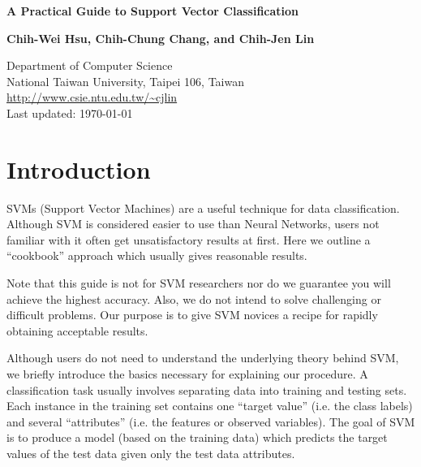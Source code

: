 \documentclass[12pt]{article}
\begin{document}
\setlength{\baselineskip}{18pt}
\begin{center}
{\Large\bf A Practical Guide to Support Vector Classification}

\bigskip

{\bf Chih-Wei Hsu, Chih-Chung Chang, and
 Chih-Jen Lin}\\
\medskip

Department of Computer Science\\
National Taiwan University, Taipei 106, Taiwan \\
\url{http://www.csie.ntu.edu.tw/~cjlin}\\
Last updated: \today
\end{center}
\smallskip


\begin{abstract}
The support vector machine (SVM) is a popular classification
technique. However, beginners who are not familiar with SVM often
get unsatisfactory results since they miss some easy but significant
steps. In this guide, we propose a simple procedure which usually
gives reasonable results.
\end{abstract}


\section{Introduction}
\label{intro}
SVMs (Support Vector Machines) are a useful technique for data
classification. Although SVM is considered easier to use than Neural
Networks, users not familiar with it often get unsatisfactory results
at first.  Here we outline a ``cookbook'' approach which usually gives
reasonable results.

Note that this guide is not for SVM researchers nor do we guarantee
you will achieve the highest accuracy. Also, we do not intend to solve
challenging or difficult problems. Our purpose is to give SVM novices
a recipe for rapidly obtaining acceptable results. 

Although users do not need to understand the underlying theory behind
SVM, we briefly introduce the basics necessary for explaining our
procedure. A classification task usually involves separating data into
training and testing sets. Each instance in the training set contains
one ``target value'' (i.e. the class labels) and several
``attributes'' (i.e. the features or observed variables). The goal of
SVM is to produce a model (based on the training data) which predicts
the target values of the test data given only the test data
attributes. 
\end{document}
